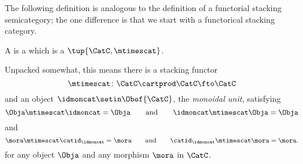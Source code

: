 
\label{sec:strict-monoidal-categories}

The following definition is analogous to the definition of a functorial stacking semicategory; the one difference is that we start with a functorical stacking category.

\begin{ctdefinition}
    \label{def:strict-monoidal-category}
    A  is a  which is a  $\tup{\CatC, \mtimescat}$.

    Unpacked somewhat, this means there is a stacking functor
    \begin{equation}
        \mtimescat \colon \CatC \cartprod \CatC \fto \CatC
    \end{equation}
    and an object $\idmoncat \setin \Obof{\CatC}$, the \emph{monoidal unit}, satisfying
    \begin{equation}
        \Obja \mtimescat \idmoncat = \Obja \qquad \text{and} \qquad \idmoncat \mtimescat \Obja = \Obja
    \end{equation}
    and
    \begin{equation}
        \mora \mtimescat \catid_\idmoncat = \mora \qquad \text{and} \qquad \catid_\idmoncat \mtimescat \mora = \mora.
    \end{equation}
    for any object $\Obja$ and any morphism $\mora$ in $\CatC$.
\end{ctdefinition}



